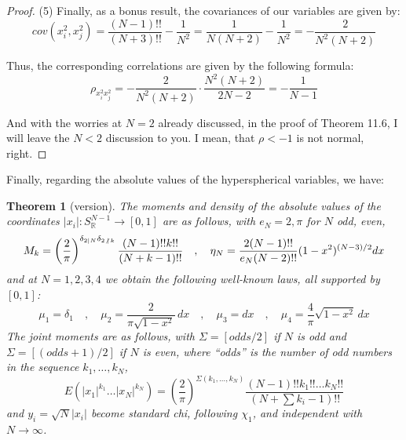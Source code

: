 \documentclass[12pt]{amsbook}
\newtheorem{theorem}{Theorem}[chapter]
\begin{document}
\begin{proof}
(5) Finally, as a bonus result, the covariances of our variables are given by:
$$cov(x_i^2,x_j^2)=\frac{(N-1)!!}{(N+3)!!}-\frac{1}{N^2}=\frac{1}{N(N+2)}-\frac{1}{N^2}=-\frac{2}{N^2(N+2)}$$

Thus, the corresponding correlations are given by the following formula:
$$\rho_{x_i^2x_j^2}=-\frac{2}{N^2(N+2)}\cdot\frac{N^2(N+2)}{2N-2}=-\frac{1}{N-1}$$

And with the worries at $N=2$ already discussed, in the proof of Theorem 11.6, I will leave the $N<2$ discussion to you. I mean, that $\rho<-1$ is not normal, right.
\end{proof}

Finally, regarding the absolute values of the hyperspherical variables, we have:

\begin{theorem}[version]
The moments and density of the absolute values of the coordinates $|x_i|:S^{N-1}_\mathbb R\to[0,1]$ are as follows, with $e_N=2,\pi$ for $N$ odd, even,
$$M_k=\left(\frac{2}{\pi}\right)^{\delta_{2|N}\delta_{2\not\:|\,k}}\frac{(N-1)!!k!!}{(N+k-1)!!}\quad,\quad\eta_N=\frac{2(N-1)!!}{e_N(N-2)!!}(1-x^2)^{(N-3)/2}dx$$
and at $N=1,2,3,4$ we obtain the following well-known laws, all supported by $[0,1]$:
$$\mu_1=\delta_1\quad,\quad\mu_2=\frac{2}{\pi\sqrt{1-x^2}}\,dx
\quad,\quad\mu_3=dx\quad,\quad\mu_4=\frac{4}{\pi}\sqrt{1-x^2}\,dx$$
The joint moments are as follows, with $\Sigma=[odds/2]$ if $N$ is odd and $\Sigma=[(odds+1)/2]$ if $N$ is even, where ``odds'' is the number of odd numbers in the sequence $k_1,\ldots,k_N$,
$$E(|x_1|^{k_1}\ldots|x_N|^{k_N})=\left(\frac{2}{\pi}\right)^{\Sigma(k_1,\ldots,k_N)}\frac{(N-1)!!k_1!!\ldots k_N!!}{(N+\sum k_i-1)!!}$$
and $y_i=\sqrt{N}|x_i|$ become standard chi, following $\chi_1$, and independent with $N\to\infty$.
\end{theorem}
\end{document}
